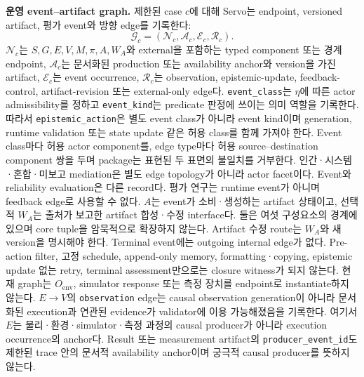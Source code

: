 \documentclass[11pt]{article}
\begin{document}
\noindent\textbf{운영 event--artifact graph.}
제한된 case $c$에 대해 Servo는 endpoint, versioned artifact, 평가 event와 방향 edge를 기록한다:
\begin{equation}
  \mathcal G_c=(\mathcal N_c,\mathcal A_c,\mathcal E_c,\mathcal R_c).
  \label{eq:operational-loop}
\end{equation}
$\mathcal N_c$는 $S,G,E,V,M,\pi,A,W_A$와 external을 포함하는 typed component 또는 경계 endpoint, $\mathcal A_c$는 문서화된 production 또는 availability anchor와 version을 가진 artifact, $\mathcal E_c$는 event occurrence, $\mathcal R_c$는 observation, epistemic-update, feedback-control, artifact-revision 또는 external-only edge다. \texttt{event\_class}는 $\eta$에 따른 actor admissibility를 정하고 \texttt{event\_kind}는 predicate 판정에 쓰이는 의미 역할을 기록한다. 따라서 \texttt{epistemic\_action}은 별도 event class가 아니라 event kind이며 generation, runtime validation 또는 state update 같은 허용 class를 함께 가져야 한다. Event class마다 허용 actor component를, edge type마다 허용 source--destination component 쌍을 두며 package는 표현된 두 표면의 불일치를 거부한다. 인간·시스템·혼합·미보고 mediation은 별도 edge topology가 아니라 actor facet이다. Event와 reliability evaluation은 다른 record다. 평가 연구는 runtime event가 아니며 feedback edge로 사용할 수 없다. $A$는 event가 소비·생성하는 artifact 상태이고, 선택적 $W_A$는 출처가 보고한 artifact 합성·수정 interface다. 둘은 여섯 구성요소의 경계에 있으며 core tuple을 암묵적으로 확장하지 않는다. Artifact 수정 route는 $W_A$와 새 version을 명시해야 한다. Terminal event에는 outgoing internal edge가 없다. Pre-action filter, 고정 schedule, append-only memory, formatting·copying, epistemic update 없는 retry, terminal assessment만으로는 closure witness가 되지 않는다. 현재 graph는 $O_{\mathrm{env}}$, simulator response 또는 측정 장치를 endpoint로 instantiate하지 않는다. $E\rightarrow V$의 \texttt{observation} edge는 causal observation generation이 아니라 문서화된 execution과 연관된 evidence가 validator에 이용 가능해졌음을 기록한다. 여기서 $E$는 물리·환경·simulator·측정 과정의 causal producer가 아니라 execution occurrence의 anchor다. Result 또는 measurement artifact의 \texttt{producer\_event\_id}도 제한된 trace 안의 문서적 availability anchor이며 궁극적 causal producer를 뜻하지 않는다.
\end{document}
